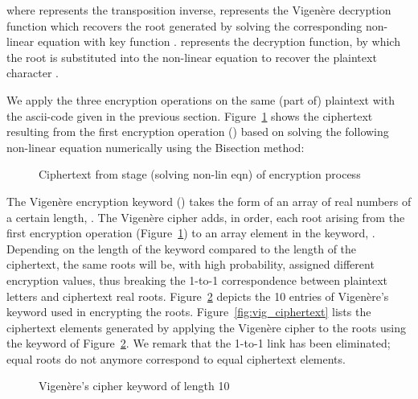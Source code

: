 \documentclass[10pt,journal]{IEEEtran}
\begin{document}
\noindent where  represents the transposition
inverse,  represents the Vigen\`ere decryption
function which recovers the root  generated by solving the
corresponding non-linear equation with key function .
 represents the decryption function, by which the
root  is substituted into the non-linear equation to recover the
plaintext character .
\newline

We apply the three encryption operations on the same (part of)
plaintext with the ascii-code given in the previous
section. Figure~\ref{fig:non_lin_enc} shows the ciphertext resulting
from the first encryption operation () based on solving
the following non-linear equation numerically using the Bisection
method:
  

\begin{figure}[h]
\centering 
{}
\caption{Ciphertext from  stage (solving non-lin eqn) of encryption process}
\label{fig:non_lin_enc}
\end{figure}

The Vigen\`ere encryption keyword () takes the form of an
array of real numbers of a certain length, . The Vigen\`ere
cipher adds, in order, each root arising from the first encryption
operation (Figure~\ref{fig:non_lin_enc}) to an array element in the
keyword, . Depending on the length of the
keyword compared to the length of the ciphertext, the same roots will
be, with high probability, assigned different encryption values, thus
breaking the 1-to-1 correspondence between plaintext letters and
ciphertext real roots. Figure~\ref{fig:vig_keyword} depicts the 10
entries of Vigen\`ere's keyword used in encrypting the
roots. Figure~\ref{fig:vig_ciphertext} lists the ciphertext elements
generated by applying the Vigen\`ere cipher to the roots using the
keyword of Figure~\ref{fig:vig_keyword}. We remark that the 1-to-1 
link has been eliminated; equal roots do not anymore correspond to 
equal ciphertext elements.

\begin{figure}[H]
\centering 
{}
\caption{Vigen\`ere's cipher keyword of length 10} \label{fig:vig_keyword}
\end{figure}
\end{document}
